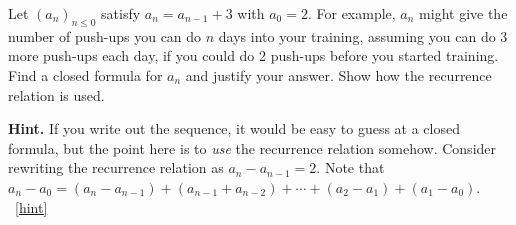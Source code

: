 \documentclass{book}
\begin{document}
\setcounter{project}{143}
\addtocounter{project}{-1}
\begin{activity}[]\label{act-arithmetic}
\hypertarget{p-950}{}%
Let \((a_n)_{n \le 0}\) satisfy \(a_n = a_{n-1} + 3\) with \(a_0 = 2\).  For example, \(a_n\) might give the number of push-ups you can do \(n\) days into your training, assuming you can do 3 more push-ups each day, if you could do 2 push-ups before you started training.  Find a closed formula for \(a_n\) and justify your answer.  Show how the recurrence relation is used.%
\par\smallskip%
\noindent\textbf{Hint.}\hypertarget{hint-102}{}\quad%
\hypertarget{p-951}{}%
If you write out the sequence, it would be easy to guess at a closed formula, but the point here is to \emph{use} the recurrence relation somehow.  Consider rewriting the recurrence relation as \(a_n - a_{n-1} = 2\).  Note that \(a_n - a_0 = (a_n - a_{n-1}) + (a_{n-1} + a_{n-2}) + \cdots + (a_2 - a_1) + (a_1 - a_0)\).%
~\hfill{\tiny\hyperlink{a-143}{[hint]}\hypertarget{q-143}{}}\end{activity}
\end{document}

